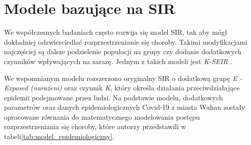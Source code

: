 \section{\textbf{Modele bazujące na SIR}}

We współczesnych badaniach często rozwija się model SIR, tak aby mógł dokładniej odzwierciedlać rozprzestrzenianie się choroby. Takimi modyfikacjami najczęściej są dalsze podzielenie populacji na grupy czy dodanie dodatkowych czynników wpływających na zarazę. Jednym z takich modeli jest \textit {K-SEIR}
\cite{bib:artykul}.

We wspomnianym modelu rozszerzono oryginalny SIR o dodatkową grupę \textit { E - Exposed (narażeni)} oraz czynnik \textit {K}, który określa działania przeciwdziałające epidemii podejmowane przez ludzi. Na podstawie modelu, dodatkowych parametrów oraz danych epidemiologicznych Covid-19 z miasta Wuhan zostały opracowane równania do matematycznego modelowania postępu rozprzestrzeniania się choroby, które autorzy przedstawili w tabeli\ref{tab:model_epidemiologiczny}.

